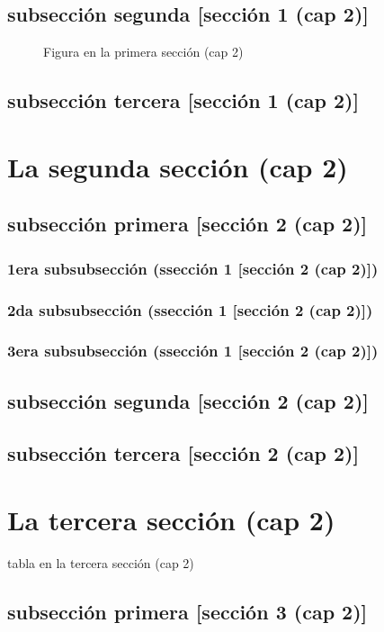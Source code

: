 \documentclass[12pt,a4paper]{report}
\begin{document}
\subsection*{subsección segunda [sección 1 (cap 2)]}
\begin{figure}[H]
\caption{Figura en la primera sección (cap 2)}
\end{figure}
\subsection*{subsección tercera [sección 1 (cap 2)]}
\section*{La segunda sección (cap 2)}
\subsection*{subsección primera [sección 2 (cap 2)]}
\subsubsection*{1era subsubsección (ssección 1 [sección 2 (cap 2)])}
\subsubsection*{2da subsubsección (ssección 1 [sección 2 (cap 2)])}
\subsubsection*{3era subsubsección (ssección 1 [sección 2 (cap 2)])}
\subsection*{subsección segunda [sección 2 (cap 2)]}
\subsection*{subsección tercera [sección 2 (cap 2)]}
\section*{La tercera sección (cap 2)}
\begin{table}[H]
\caption{tabla en la tercera sección (cap 2)}
\end{table}
\subsection*{subsección primera [sección 3 (cap 2)]}
\end{document}
